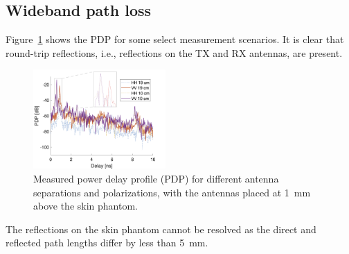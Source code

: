 \documentclass[preprint]{rsl}
\begin{document}
\subsection{Wideband path loss}

Figure~\ref{fig:PDP} shows the PDP for some select measurement scenarios. 
It is clear that round-trip reflections, i.e., reflections on the TX and RX antennas, are present.
\begin{figure}[tb]
\begin{center}
	\includegraphics[width=0.45\textwidth]{figures/PDP.png}
\caption{Measured power delay profile (PDP) for different antenna separations and polarizations, with the antennas placed at 1~mm above the skin phantom.}
\label{fig:PDP}
\end{center}
\end{figure}
The reflections on the skin phantom cannot be resolved as the direct and reflected path lengths differ by less than 5~mm.
\end{document}

